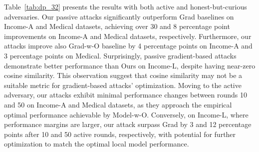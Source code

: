 Table~\ref{tab:dp_32} presents the results with both active and honest-but-curious adversaries. 
Our passive attacks significantly outperform Grad baselines on Income-A and Medical datasets, achieving over 30 and 8 percentage point improvements on Income-A and Medical datasets, respectively. Furthermore, our attacks improve also Grad-w-O baseline by 4 percentage points on Income-A and 3 percentage points on Medical. Surprisingly, passive gradient-based attacks demonstrate better performance than Ours on Income-L, despite having near-zero cosine similarity. This observation suggest that cosine similarity may not be a suitable metric for gradient-based attacks' optimization. Moving to the active adversary, our attacks exhibit minimal performance changes between rounds 10 and 50 on Income-A and Medical datasets, as they approach the empirical optimal performance achievable by Model-w-O. Conversely, on Income-L, where performance margins are larger, our attack surpass Grad by 3 and 12 percentage points after 10 and 50 active rounds, respectively, with potential for further optimization to match the optimal local model performance.
